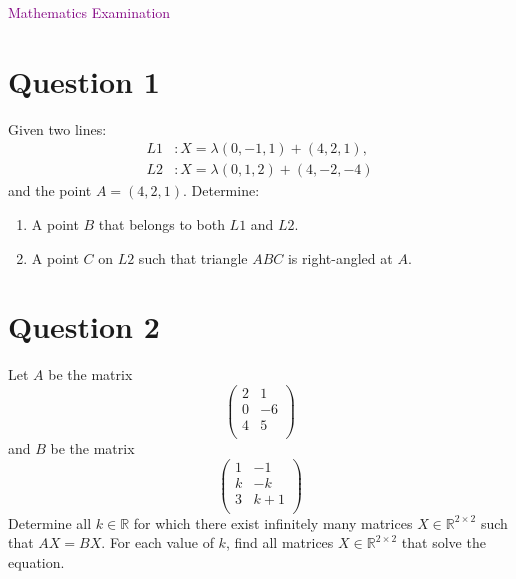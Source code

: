 \documentclass[12pt,a4paper]{article}
\begin{document}
	
	\begin{center}
		\colorbox{gray!20}{
			\parbox{0.7\textwidth}{
				\centering \Huge \textcolor{purple}{Mathematics Examination}
			}
		}
	\end{center}
	\vspace{10mm}
	
	\section*{Question 1}
	Given two lines:
	\begin{align*}
		L1 &: X = \lambda(0,-1,1) + (4,2,1), \\
		L2 &: X = \lambda(0,1,2) + (4,-2,-4)
	\end{align*}
	and the point \( A = (4,2,1) \). Determine:
	\begin{enumerate}[label=\textcolor{purple}{\arabic*}.]
		\item A point \( B \) that belongs to both \( L1 \) and \( L2 \).
		\item A point \( C \) on \( L2 \) such that triangle \( ABC \) is right-angled at \( A \).
	\end{enumerate}
	
	\section*{Question 2}
	Let \( A \) be the matrix
	\[
	\begin{pmatrix}
		2 & 1 \\
		0 & -6 \\
		4 & 5 \\
	\end{pmatrix}
	\]
	and \( B \) be the matrix
	\[
	\begin{pmatrix}
		1 & -1 \\
		k & -k \\
		3 & k+1 \\
	\end{pmatrix}
	\]
	Determine all \( k \in \mathbb{R} \) for which there exist infinitely many matrices \( X \in \mathbb{R}^{2 \times 2} \) such that \( AX = BX \). For each value of \( k \), find all matrices \( X \in \mathbb{R}^{2 \times 2} \) that solve the equation.
	
\end{document}
